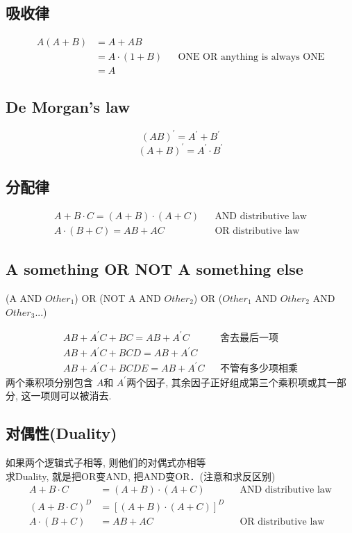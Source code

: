 \documentclass[scheme=chinese,a4paper]{report}
\begin{document}
\subsection{吸收律}
\begin{align*}
    A(A+B) &= A+AB\\
    &=A\cdot(1+B) && \text{ONE OR anything is always ONE}\\ 
    &=A
\end{align*}

\subsection{De Morgan's law}
$$(AB)^\prime=A^\prime+B^\prime$$
$$(A+B)^\prime=A^\prime\cdot B^\prime$$
\subsection{分配律}
\begin{align}
    A+B\cdot C=(A+B)\cdot (A+C) && \text{AND distributive law}\\
    A\cdot (B+C)=AB+AC && \text{OR distributive law}
\end{align}
\subsection{A something OR NOT A something else}
(A AND $Other_1$) OR (NOT A AND $Other_2$) OR ($Other_1$ AND $Other_2$ AND $Other_3$...)\par
\begin{align*}
    AB+A^\prime C+BC=AB+A^\prime C &&\text{舍去最后一项} \\
    AB+A^\prime C+BCD=AB+A^\prime C\\
    AB+A^\prime C+BCDE=AB+A^\prime C &&\text{不管有多少项相乘}
\end{align*}
两个乘积项分别包含 $ A $和 $ A ^\prime$两个因子, 其余因子正好组成第三个乘积项或其一部分, 这一项则可以被消去. 
\subsection{对偶性(Duality)}
如果两个逻辑式子相等, 则他们的对偶式亦相等\\
求Duality, 就是把OR变AND, 把AND变OR．(注意和求反区别)
\begin{align*}
    A+B\cdot C &=(A+B)\cdot (A+C) && \text{AND distributive law}\\
    (A+B\cdot C)^D &=[(A+B)\cdot (A+C)]^D\\
    A\cdot (B+C) &=AB+AC && \text{OR distributive law}
\end{align*}
\end{document}
